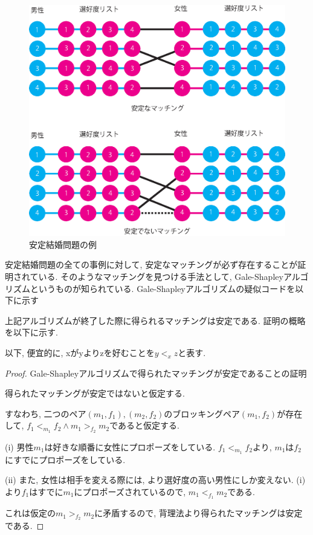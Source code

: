 \documentclass[12pt]{jarticle}
\begin{document}
\begin{figure}
  \begin{center}
    \includegraphics[scale=0.5]{image/match.eps}
  \end{center}
  \caption{安定結婚問題の例}
  \label{match}
\end{figure}

安定結婚問題の全ての事例に対して, 安定なマッチングが必ず存在することが証明されている. 
\def\gsa{Gale-Shapleyアルゴリズム}
そのようなマッチングを見つける手法として, \gsa というものが知られている. 
\gsa の疑似コードを以下に示す



上記アルゴリズムが終了した際に得られるマッチングは安定である. 
証明の概略を以下に示す. 

以下, 便宜的に, xがyよりzを好むことを$y <_x z$と表す. 

\begin{proof}
\gsa で得られたマッチングが安定であることの証明

得られたマッチングが安定ではないと仮定する. 

すなわち, 二つのペア$(m_1, f_1), (m_2, f_2)$のブロッキングペア$(m_1, f_2)$が存在して, $f_1 <_{m_1} f_2 \land m_1 >_{f_2}m_2$であると仮定する. 

(i) 男性$m_1$は好きな順番に女性にプロポーズをしている. $f_1 <_{m_1} f_2$より, $m_1$は$f_2$にすでにプロポーズをしている. 

(ii) また, 女性は相手を変える際には, より選好度の高い男性にしか変えない. (i)より$f_1$はすでに$m_1$にプロポーズされているので, $m_1 <_{f_1} m_2$である. 

これは仮定の$m_1 >_{f_2}m_2$に矛盾するので, 背理法より得られたマッチングは安定である. 

\end{proof}
\end{document}
